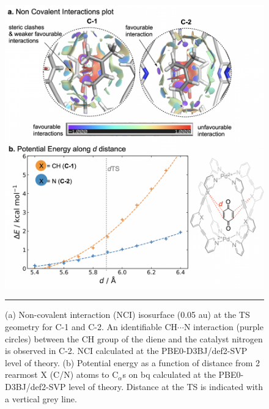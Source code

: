 \documentclass[../../main.tex]{subfiles}
\begin{document}
\begin{figure}[h!]
	\vspace{0.4cm}
	\centering
	\includegraphics[width=12cm]{3/da//figs/figS29}
	\vspace{0.2cm}
	\hrule
	\caption{(a) Non-covalent interaction (NCI) isosurface (0.05 au) at the TS geometry for C-1 and C-2. An identifiable CH$\cdots$N interaction (purple circles) between the CH group of the diene and the catalyst nitrogen is observed in C-2. NCI calculated at the PBE0-D3BJ/def2-SVP level of theory. (b) Potential energy as a function of distance from 2 rearmost X (C/N) atoms to C$_\alpha$s on bq calculated at the PBE0-D3BJ/def2-SVP level of theory. Distance at the TS is indicated with a vertical grey line.}
	\label{fig::si_da_29}
\end{figure}
\end{document}
